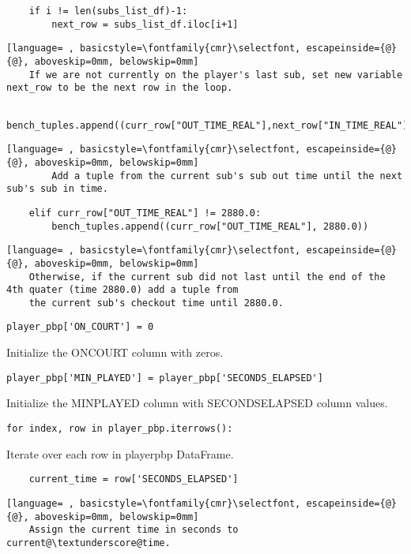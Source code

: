 \documentclass{article}
\begin{document}
\begin{lstlisting}
    if i != len(subs_list_df)-1:
        next_row = subs_list_df.iloc[i+1]
\end{lstlisting}
\begin{lstlisting}[language= , basicstyle=\fontfamily{cmr}\selectfont, escapeinside={@}{@}, aboveskip=0mm, belowskip=0mm]
    If we are not currently on the player's last sub, set new variable next_row to be the next row in the loop.
\end{lstlisting}
\begin{lstlisting}
        bench_tuples.append((curr_row["OUT_TIME_REAL"],next_row["IN_TIME_REAL"]))
\end{lstlisting}
\begin{lstlisting}[language= , basicstyle=\fontfamily{cmr}\selectfont, escapeinside={@}{@}, aboveskip=0mm, belowskip=0mm]
        Add a tuple from the current sub's sub out time until the next sub's sub in time.
\end{lstlisting}
\begin{lstlisting}
    elif curr_row["OUT_TIME_REAL"] != 2880.0:
        bench_tuples.append((curr_row["OUT_TIME_REAL"], 2880.0))
\end{lstlisting}
\begin{lstlisting}[language= , basicstyle=\fontfamily{cmr}\selectfont, escapeinside={@}{@}, aboveskip=0mm, belowskip=0mm]
    Otherwise, if the current sub did not last until the end of the 4th quater (time 2880.0) add a tuple from
    the current sub's checkout time until 2880.0.
\end{lstlisting}
\begin{lstlisting}
player_pbp['ON_COURT'] = 0
\end{lstlisting}
Initialize the ON\textunderscore COURT column with zeros.
\begin{lstlisting}
player_pbp['MIN_PLAYED'] = player_pbp['SECONDS_ELAPSED']
\end{lstlisting}
Initialize the MIN\textunderscore PLAYED column with SECONDS\textunderscore ELAPSED column values.
\begin{lstlisting}
for index, row in player_pbp.iterrows():
\end{lstlisting}
Iterate over each row in player\textunderscore pbp DataFrame.
\begin{lstlisting}
    current_time = row['SECONDS_ELAPSED']
\end{lstlisting}
\begin{lstlisting}[language= , basicstyle=\fontfamily{cmr}\selectfont, escapeinside={@}{@}, aboveskip=0mm, belowskip=0mm]
    Assign the current time in seconds to current@\textunderscore@time.    
\end{lstlisting}
\end{document}

